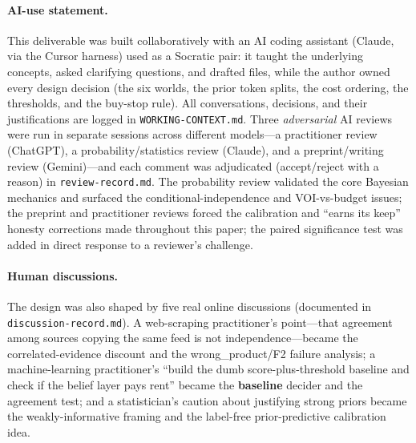 \documentclass[11pt]{article}
\begin{document}
\paragraph{AI-use statement.} This deliverable was built collaboratively with an AI
coding assistant (Claude, via the Cursor harness) used as a Socratic pair: it taught
the underlying concepts, asked clarifying questions, and drafted files, while the author
owned every design decision (the six worlds, the prior token splits, the cost ordering,
the thresholds, and the buy-stop rule). All conversations, decisions, and their
justifications are logged in \texttt{WORKING-CONTEXT.md}. Three \emph{adversarial} AI
reviews were run in separate sessions across different models---a practitioner review
(ChatGPT), a probability/statistics review (Claude), and a preprint/writing review
(Gemini)---and each comment was adjudicated (accept/reject with a reason) in
\texttt{review-record.md}. The probability review validated the core Bayesian mechanics
and surfaced the conditional-independence and VOI-vs-budget issues; the preprint and
practitioner reviews forced the calibration and ``earns its keep'' honesty corrections
made throughout this paper; the paired significance test was added in direct response
to a reviewer's challenge.

\paragraph{Human discussions.} The design was also shaped by five real online
discussions (documented in \texttt{discussion-record.md}). A web-scraping practitioner's
point---that agreement among sources copying the same feed is not independence---became
the correlated-evidence discount and the \textsf{wrong\_product}/F2 failure analysis; a
machine-learning practitioner's ``build the dumb score-plus-threshold baseline and check
if the belief layer pays rent'' became the \textbf{baseline} decider and the agreement
test; and a statistician's caution about justifying strong priors became the
weakly-informative framing and the label-free prior-predictive calibration idea.
\end{document}

